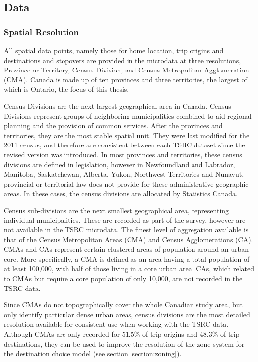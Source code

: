 \subsection{Data}
\label{section:tsrcdata}
\subsubsection{Spatial Resolution}
All spatial data points, namely those for home location, trip origins and destinations and stopovers are provided in the microdata at three resolutions, Province or Territory, Census Division, and Census Metropolitan Agglomeration (CMA). Canada is made up of ten provinces and three territories, the largest of which is Ontario, the focus of this thesis. 

Census Divisions are the next largest geographical area in Canada. Census Divisions represent groups of neighboring municipalities combined to aid regional planning and the provision of common services. After the provinces and territories, they are the most stable spatial unit. They were last modified for the 2011 census, and therefore are consistent between each TSRC dataset since the revised version was introduced. In most provinces and territories, these census divisions are defined in legislation, however in Newfoundland and Labrador, Manitoba, Saskatchewan, Alberta, Yukon, Northwest Territories and Nunavut, provincial or territorial law does not provide for these administrative geographic areas. In these cases, the census divisions are allocated by Statistics Canada.

Census sub-divisions are the next smallest geographical area, representing individual municipalities. These are recorded as part of the survey, however are not available in the TSRC microdata. The finest level of aggregation available is that of the Census Metropolitan Areas (CMA) and Census Agglomerations (CA). CMAs and CAs represent certain clustered areas of population around an urban core. More specifically, a CMA is defined as an area having a total population of at least 100,000, with half of those living in a core urban area. CAs, which related to CMAs but require a core population of only 10,000, are not recorded in the TSRC data. 

Since CMAs do not topographically cover the whole Canadian study area, but only identify particular dense urban areas, census divisions are the most detailed resolution available for consistent use when working with the TSRC data. Although CMAs are only recorded for 51.5\% of trip origins and 48.3\% of trip destinations, they can be used to improve the resolution of the zone system for the destination choice model (see section \ref{section:zoning}).

